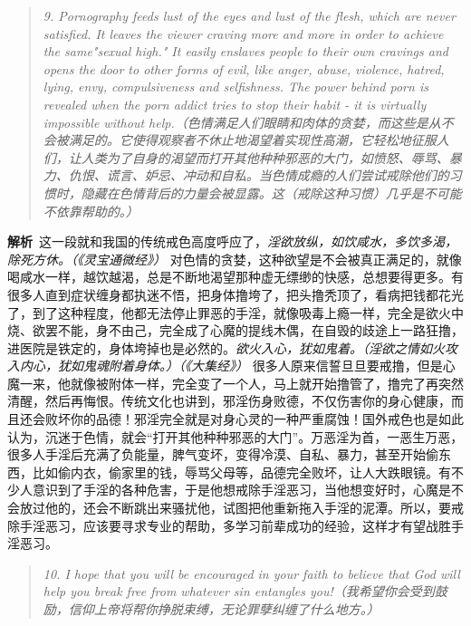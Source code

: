 \begin{quote}\it
    9. Pornography feeds lust of the eyes and lust of the flesh, which are never satisfied. It leaves the viewer craving more and more in order to achieve the same"sexual high." It easily enslaves people to their own cravings and opens the door to other forms of evil, like anger, abuse, violence, hatred, lying, envy, compulsiveness and selfishness. The power behind porn is revealed when the porn addict tries to stop their habit - it is virtually impossible without help.（色情满足人们眼睛和肉体的贪婪，而这些是从不会被满足的。它使得观察者不休止地渴望着实现性高潮，它轻松地征服人们，让人类为了自身的渴望而打开其他种种邪恶的大门，如愤怒、辱骂、暴力、仇恨、谎言、妒忌、冲动和自私。当色情成瘾的人们尝试戒除他们的习惯时，隐藏在色情背后的力量会被显露。这（戒除这种习惯）几乎是不可能不依靠帮助的。）
\end{quote}

\textbf{解析}\ 这一段就和我国的传统戒色高度呼应了，\textit{淫欲放纵，如饮咸水，多饮多渴，除死方休。（《灵宝通微经》）} 对色情的贪婪，这种欲望是不会被真正满足的，就像喝咸水一样，越饮越渴，总是不断地渴望那种虚无缥缈的快感，总想要得更多。有很多人直到症状缠身都执迷不悟，把身体撸垮了，把头撸秃顶了，看病把钱都花光了，到了这种程度，他都无法停止罪恶的手淫，就像吸毒上瘾一样，完全是欲火中烧、欲罢不能，身不由己，完全成了心魔的提线木偶，在自毁的歧途上一路狂撸，进医院是铁定的，身体垮掉也是必然的。\textit{欲火入心，犹如鬼着。（淫欲之情如火攻入内心，犹如鬼魂附着身体。）（《大集经》）} 很多人原来信誓旦旦要戒撸，但是心魔一来，他就像被附体一样，完全变了一个人，马上就开始撸管了，撸完了再突然清醒，然后再悔恨。传统文化也讲到，邪淫伤身败德，不仅伤害你的身心健康，而且还会败坏你的品德！邪淫完全就是对身心灵的一种严重腐蚀！国外戒色也是如此认为，沉迷于色情，就会“打开其他种种邪恶的大门”。万恶淫为首，一恶生万恶，很多人手淫后充满了负能量，脾气变坏，变得冷漠、自私、暴力，甚至开始偷东西，比如偷内衣，偷家里的钱，辱骂父母等，品德完全败坏，让人大跌眼镜。有不少人意识到了手淫的各种危害，于是他想戒除手淫恶习，当他想变好时，心魔是不会放过他的，还会不断跳出来骚扰他，试图把他重新拖入手淫的泥潭。所以，要戒除手淫恶习，应该要寻求专业的帮助，多学习前辈成功的经验，这样才有望战胜手淫恶习。

\begin{quote}\it
    10. I hope that you will be encouraged in your faith to believe that God will help you break free from whatever sin entangles you!（我希望你会受到鼓励，信仰上帝将帮你挣脱束缚，无论罪孽纠缠了什么地方。）
\end{quote}

